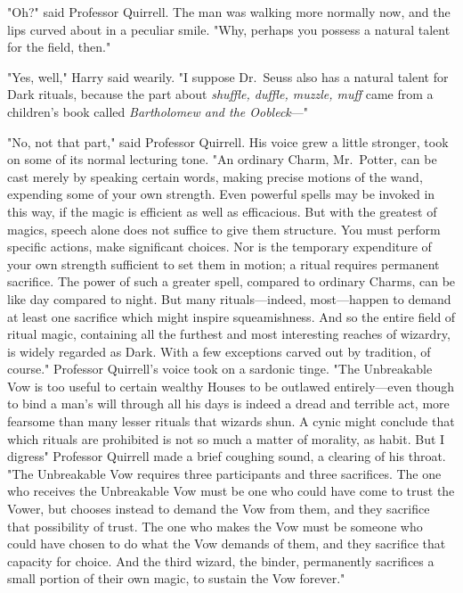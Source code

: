 "Oh?" said Professor Quirrell. The man was walking more normally now, and the
lips curved about in a peculiar smile. "Why, perhaps you possess a natural
talent for the field, then."

"Yes, well," Harry said wearily. "I suppose Dr.~Seuss also has a natural talent
for Dark rituals, because the part about \emph{shuffle, duffle, muzzle, muff}
came from a children's book called \emph{Bartholomew and the Oobleck}---"

"No, not that part," said Professor Quirrell. His voice grew a little stronger,
took on some of its normal lecturing tone. "An ordinary Charm, Mr.~Potter, can
be cast merely by speaking certain words, making precise motions of the wand,
expending some of your own strength. Even powerful spells may be invoked in
this way, if the magic is efficient as well as efficacious. But with the
greatest of magics, speech alone does not suffice to give them structure. You
must perform specific actions, make significant choices. Nor is the temporary
expenditure of your own strength sufficient to set them in motion; a ritual
requires permanent sacrifice. The power of such a greater spell, compared to
ordinary Charms, can be like day compared to night. But many rituals---indeed,
most---happen to demand at least one sacrifice which might inspire
squeamishness. And so the entire field of ritual magic, containing all the
furthest and most interesting reaches of wizardry, is widely regarded as Dark.
With a few exceptions carved out by tradition, of course." Professor Quirrell's
voice took on a sardonic tinge. "The Unbreakable Vow is too useful to certain
wealthy Houses to be outlawed entirely---even though to bind a man's will
through all his days is indeed a dread and terrible act, more fearsome than
many lesser rituals that wizards shun. A cynic might conclude that which
rituals are prohibited is not so much a matter of morality, as habit. But I
digress{\el}" Professor Quirrell made a brief coughing sound, a clearing of
his throat. "The Unbreakable Vow requires three participants and three
sacrifices. The one who receives the Unbreakable Vow must be one who could have
come to trust the Vower, but chooses instead to demand the Vow from them, and
they sacrifice that possibility of trust. The one who makes the Vow must be
someone who could have chosen to do what the Vow demands of them, and they
sacrifice that capacity for choice. And the third wizard, the binder,
permanently sacrifices a small portion of their own magic, to sustain the Vow
forever."

